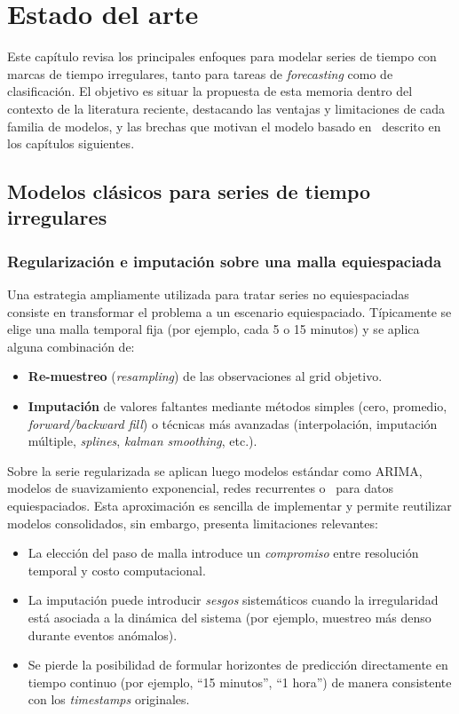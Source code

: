 \chapter{Estado del arte}
\label{cap:estado-del-arte}

Este capítulo revisa los principales enfoques para modelar series de tiempo con marcas de tiempo irregulares, tanto para tareas de \emph{forecasting} como de clasificación. El objetivo es situar la propuesta de esta memoria dentro del contexto de la literatura reciente, destacando las ventajas y limitaciones de cada familia de modelos, y las brechas que motivan el modelo basado en \Transformers\ descrito en los capítulos siguientes.

\section{Modelos clásicos para series de tiempo irregulares}
\label{sec:estado-arte-clasicos}

\subsection{Regularización e imputación sobre una malla equiespaciada}

Una estrategia ampliamente utilizada para tratar series no equiespaciadas consiste en transformar el problema a un escenario equiespaciado. Típicamente se elige una malla temporal fija (por ejemplo, cada 5 o 15 minutos) y se aplica alguna combinación de:
\begin{itemize}
    \item \textbf{Re-muestreo} (\textit{resampling}) de las observaciones al grid objetivo.
    \item \textbf{Imputación} de valores faltantes mediante métodos simples (cero, promedio, \textit{forward/backward fill}) o técnicas más avanzadas (interpolación, imputación múltiple, \textit{splines}, \emph{kalman smoothing}, etc.).
\end{itemize}

Sobre la serie regularizada se aplican luego modelos estándar como ARIMA, modelos de suavizamiento exponencial, redes recurrentes o \Transformers\ para datos equiespaciados. Esta aproximación es sencilla de implementar y permite reutilizar modelos consolidados, sin embargo, presenta limitaciones relevantes:
\begin{itemize}
    \item La elección del paso de malla introduce un \textit{compromiso} entre resolución temporal y costo computacional.
    \item La imputación puede introducir \textit{sesgos} sistemáticos cuando la irregularidad está asociada a la dinámica del sistema (por ejemplo, muestreo más denso durante eventos anómalos).
    \item Se pierde la posibilidad de formular horizontes de predicción directamente en tiempo continuo (por ejemplo, ``15 minutos'', ``1 hora'') de manera consistente con los \emph{timestamps} originales.
\end{itemize}


